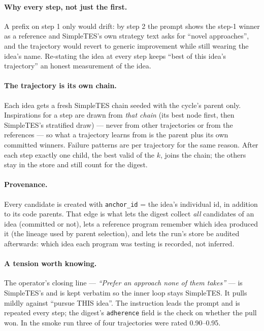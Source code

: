 \documentclass[11pt]{article}
\begin{document}
\paragraph{Why every step, not just the first.} A prefix on step 1 only would drift: by step 2
the prompt shows the step-1 winner as a reference and SimpleTES's own strategy text asks for
``novel approaches'', and the trajectory would revert to generic improvement while still wearing
the idea's name. Re-stating the idea at every step keeps ``best of this idea's trajectory'' an
honest measurement of the idea.

\paragraph{The trajectory is its own chain.} Each idea gets a fresh SimpleTES chain seeded with
the cycle's parent only. Inspirations for a step are drawn from \emph{that chain} (its best
node first, then SimpleTES's stratified draw) --- never from other trajectories or from the
references --- so what a trajectory learns from is the parent plus its own committed winners.
Failure patterns are per trajectory for the same reason. After each step exactly one child, the
best valid of the $k$, joins the chain; the others stay in the store and still count for the
digest.

\paragraph{Provenance.} Every candidate is created with \texttt{anchor\_id} = the idea's
individual id, in addition to its code parents. That edge is what lets the digest collect
\emph{all} candidates of an idea (committed or not), lets a reference program remember which
idea produced it (the lineage used by parent selection), and lets the run's store be audited
afterwards: which idea each program was testing is recorded, not inferred.

\paragraph{A tension worth knowing.} The operator's closing line --- \emph{``Prefer an approach
none of them takes''} --- is SimpleTES's and is kept verbatim so the inner loop stays SimpleTES.
It pulls mildly against ``pursue THIS idea''. The instruction leads the prompt and is
repeated every step; the digest's \texttt{adherence} field is the check on whether the pull
won. In the smoke run three of four trajectories were rated 0.90--0.95.
\end{document}
